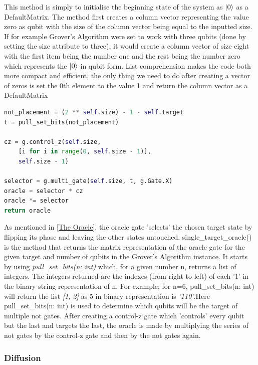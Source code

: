 \documentclass{article}
\begin{document}
This method is simply to initialise the beginning state of the system as $\ket{0}$ as a DefaultMatrix. The method first creates a column vector representing the value zero as qubit with the size of the column vector being equal to the inputted size. If for example Grover's Algorithm were set to work with three qubits (done by setting the size attribute to three), it would create a column vector of size eight with the first item being the number one and the rest being the number zero which represents the $\ket{0}$ in qubit form. List comprehension makes the code both more compact and efficient, the only thing we need to do after creating a vector of zeros is set the 0th element to the value 1 and return the column vector as a DefaultMatrix

\begin{file}
\begin{lstlisting}[language=Python]
not_placement = (2 ** self.size) - 1 - self.target
t = pull_set_bits(not_placement)

cz = g.control_z(self.size, 
	[i for i in range(0, self.size - 1)],
	self.size - 1)
	
selector = g.multi_gate(self.size, t, g.Gate.X)
oracle = selector * cz
oracle *= selector
return oracle

\end{lstlisting}
\end{file}

As mentioned in \ref{The Oracle}, the oracle gate 'selects' the chosen target state by flipping its phase and leaving the other states untouched. single\_target\_oracle() is the method that returns the matrix representation of the oracle gate for the given target and number of qubits in the Grover's Algorithm instance. It starts by using \textit{pull\_set\_bits(n: int)} which, for a given number n, returns a list of integers. The integers returned are the indexes (from right to left) of each '1' in the binary string representation of n. For example; for n=6, pull\_set\_bits(n: int) will return the list \textit{[1, 2]} as 5 in binary representation is \textit{'110'}.Here pull\_set\_bits(n: int) is used to determine which qubits will be the target of multiple not gates. After creating a control-z gate which 'controls' every qubit but the last and targets the last, the oracle is made by multiplying the series of not gates by the control-z gate and then by the not gates again.
\pagebreak


\subsubsection{Diffusion}
\end{document}

